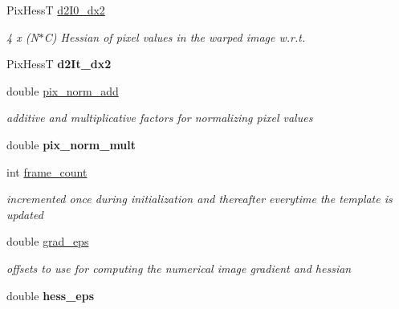 \begin{DoxyCompactItemize}
\item 
Pix\-Hess\-T \hyperlink{classImageBase_a4540fc64d3c65262b2c489d9380f09d3}{d2\-I0\-\_\-dx2}
\begin{DoxyCompactList}\small\item\em 4 x (N$\ast$\-C) Hessian of pixel values in the warped image w.\-r.\-t. \end{DoxyCompactList}\item 
\hypertarget{classImageBase_a242904300650df81767929bfd312998b}{Pix\-Hess\-T {\bfseries d2\-It\-\_\-dx2}}\label{classImageBase_a242904300650df81767929bfd312998b}

\item 
\hypertarget{classImageBase_ab4c84af6cf0169cae8497bb1666fbd47}{double \hyperlink{classImageBase_ab4c84af6cf0169cae8497bb1666fbd47}{pix\-\_\-norm\-\_\-add}}\label{classImageBase_ab4c84af6cf0169cae8497bb1666fbd47}

\begin{DoxyCompactList}\small\item\em additive and multiplicative factors for normalizing pixel values \end{DoxyCompactList}\item 
\hypertarget{classImageBase_a35b4b321a878a44c3ee71a528689e091}{double {\bfseries pix\-\_\-norm\-\_\-mult}}\label{classImageBase_a35b4b321a878a44c3ee71a528689e091}

\item 
\hypertarget{classImageBase_a7dd1820d273ccb2e48ce0d0e2003d0b3}{int \hyperlink{classImageBase_a7dd1820d273ccb2e48ce0d0e2003d0b3}{frame\-\_\-count}}\label{classImageBase_a7dd1820d273ccb2e48ce0d0e2003d0b3}

\begin{DoxyCompactList}\small\item\em incremented once during initialization and thereafter everytime the template is updated \end{DoxyCompactList}\item 
\hypertarget{classImageBase_a3d7c35acde3316f70cc71a09f843f811}{double \hyperlink{classImageBase_a3d7c35acde3316f70cc71a09f843f811}{grad\-\_\-eps}}\label{classImageBase_a3d7c35acde3316f70cc71a09f843f811}

\begin{DoxyCompactList}\small\item\em offsets to use for computing the numerical image gradient and hessian \end{DoxyCompactList}\item 
\hypertarget{classImageBase_a7248011def174fd4c80414796927991b}{double {\bfseries hess\-\_\-eps}}\label{classImageBase_a7248011def174fd4c80414796927991b}

\end{DoxyCompactItemize}


